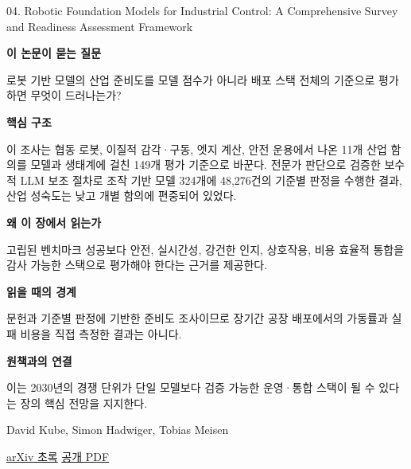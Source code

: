 \documentclass[11pt,openany]{book}
\begin{document}
\begin{termcard}{04. Robotic Foundation Models for Industrial Control: A Comprehensive Survey and Readiness Assessment Framework}

\par

\medskip

{\sffamily\bfseries\color{deepblue} 이 논문이 묻는 질문}\par

로봇 기반 모델의 산업 준비도를 모델 점수가 아니라 배포 스택 전체의 기준으로 평가하면 무엇이 드러나는가?

\smallskip

{\sffamily\bfseries\color{deepblue} 핵심 구조}\par

이 조사는 협동 로봇, 이질적 감각·구동, 엣지 계산, 안전 운용에서 나온 11개 산업 함의를 모델과 생태계에 걸친 149개 평가 기준으로 바꾼다. 전문가 판단으로 검증한 보수적 LLM 보조 절차로 조작 기반 모델 324개에 48,276건의 기준별 판정을 수행한 결과, 산업 성숙도는 낮고 개별 함의에 편중되어 있었다.

\smallskip

{\sffamily\bfseries\color{deepblue} 왜 이 장에서 읽는가}\par

고립된 벤치마크 성공보다 안전, 실시간성, 강건한 인지, 상호작용, 비용 효율적 통합을 감사 가능한 스택으로 평가해야 한다는 근거를 제공한다.

\smallskip

{\sffamily\bfseries\color{coral} 읽을 때의 경계}\par

문헌과 기준별 판정에 기반한 준비도 조사이므로 장기간 공장 배포에서의 가동률과 실패 비용을 직접 측정한 결과는 아니다.

\smallskip

{\sffamily\bfseries\color{teal} 원책과의 연결}\par

이는 2030년의 경쟁 단위가 단일 모델보다 검증 가능한 운영·통합 스택이 될 수 있다는 장의 핵심 전망을 지지한다.

\medskip

{\footnotesize\color{muted} David Kube, Simon Hadwiger, Tobias Meisen\par

\href{https://arxiv.org/abs/2603.06749}{arXiv 초록} \quad \href{https://arxiv.org/pdf/2603.06749}{공개 PDF}\par}

\end{termcard}
\end{document}
